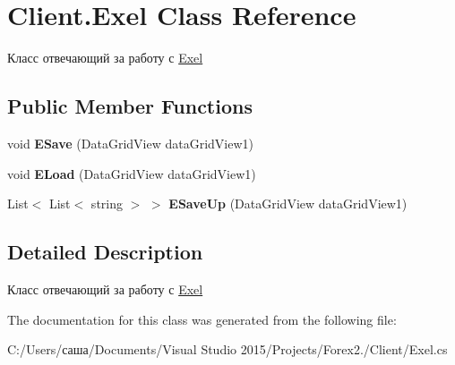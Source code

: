 \hypertarget{class_client_1_1_exel}{}\section{Client.\+Exel Class Reference}
\label{class_client_1_1_exel}


Класс отвечающий за работу с \hyperlink{class_client_1_1_exel}{Exel}  


\subsection*{Public Member Functions}
\begin{DoxyCompactItemize}
\item 
\hypertarget{class_client_1_1_exel_a6b7582eff5018df59b27dcff7665bed5}{}\label{class_client_1_1_exel_a6b7582eff5018df59b27dcff7665bed5} 
void {\bfseries E\+Save} (Data\+Grid\+View data\+Grid\+View1)
\item 
\hypertarget{class_client_1_1_exel_aad4f1e39cc59aaf42bf4bd78799f4619}{}\label{class_client_1_1_exel_aad4f1e39cc59aaf42bf4bd78799f4619} 
void {\bfseries E\+Load} (Data\+Grid\+View data\+Grid\+View1)
\item 
\hypertarget{class_client_1_1_exel_accd3e811c70509ef58988c273575b8b4}{}\label{class_client_1_1_exel_accd3e811c70509ef58988c273575b8b4} 
List$<$ List$<$ string $>$ $>$ {\bfseries E\+Save\+Up} (Data\+Grid\+View data\+Grid\+View1)
\end{DoxyCompactItemize}


\subsection{Detailed Description}
Класс отвечающий за работу с \hyperlink{class_client_1_1_exel}{Exel} 



The documentation for this class was generated from the following file\+:\begin{DoxyCompactItemize}
\item 
C\+:/\+Users/саша/\+Documents/\+Visual Studio 2015/\+Projects/\+Forex2./\+Client/Exel.\+cs\end{DoxyCompactItemize}
